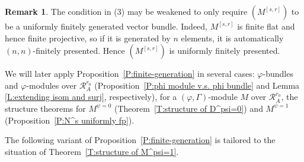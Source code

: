 \documentclass[12pt]{article}
\theoremstyle{definition}
\newtheorem{remark}[theorem]{Remark}
\numberwithin{equation}{theorem}
\newcommand{\calR}{\mathcal{R}}
\begin{document}
\begin{remark}
The condition in (3) may be weakened to only require $(M^{[s,r]})$ to be a uniformly finitely generated vector bundle.  Indeed, $M^{[s,r]}$ is finite flat and hence finite projective, so if it is generated by $n$ elements, it is automatically $(n,n)$-finitely presented. Hence $(M^{[s,r]})$ is  uniformly finitely presented.
\end{remark}



We will later apply Proposition~\ref{P:finite-generation} in several
cases: $\varphi$-bundles and $\varphi$-modules over $\calR_A^{r_0}$
(Proposition~\ref{P:phi module v.s. phi bundle} and Lemma
\ref{L:extending isom and surj}, respectively), for a $(\varphi,
\Gamma)$-module $M$ over $\calR_A^{r_0}$, the structure theorems for
$M^{\psi=0}$ (Theorem~\ref{T:structure of D^psi=0}) and $M^{\psi=1}$
(Proposition~\ref{P:N^s uniformly fp}).

The following variant of Proposition~\ref{P:finite-generation} is tailored to the situation of Theorem~\ref{T:structure of M^psi=1}.
\end{document}
